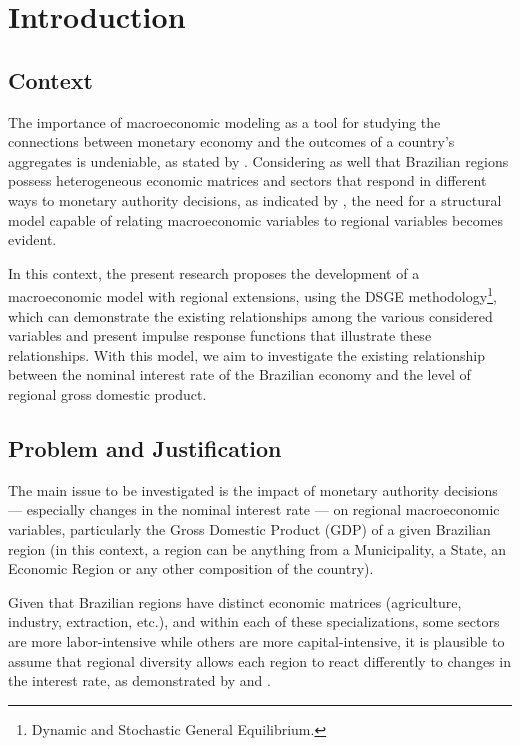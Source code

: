 \documentclass[../thesis.tex]{subfiles}
\begin{document}
\newpage

\section{Introduction}\label{sec:introduction}

\subsection*{Context}

The importance of macroeconomic modeling as a tool for studying the connections between monetary economy and the outcomes of a country's aggregates is undeniable, as stated by \textcite{gali_monetary_2015}. Considering as well that Brazilian regions possess heterogeneous economic matrices and sectors that respond in different ways to monetary authority decisions, as indicated by \textcite{bertanha_efeitos_2008}, the need for a structural model capable of relating macroeconomic variables to regional variables becomes evident.

In this context, the present research proposes the development of a macroeconomic model with regional extensions, using the DSGE methodology\footnote{Dynamic and Stochastic General Equilibrium.}, which can demonstrate the existing relationships among the various considered variables and present impulse response functions that illustrate these relationships. With this model, we aim to investigate the existing relationship between the nominal interest rate of the Brazilian economy and the level of regional gross domestic product.

\subsection*{Problem and Justification}

The main issue to be investigated is the impact of monetary authority decisions --- especially changes in the nominal interest rate --- on regional macroeconomic variables, particularly the Gross Domestic Product (GDP) of a given Brazilian region (in this context, a region can be anything from a Municipality, a State, an Economic Region or any other composition of the country).

Given that Brazilian regions have distinct economic matrices (agriculture, industry, extraction, etc.), and within each of these specializations, some sectors are more labor-intensive while others are more capital-intensive, it is plausible to assume that regional diversity allows each region to react differently to changes in the interest rate, as demonstrated by \textcite{haddad_matriz_2017} and \textcite{osterno_uma_2022}.
\end{document}
